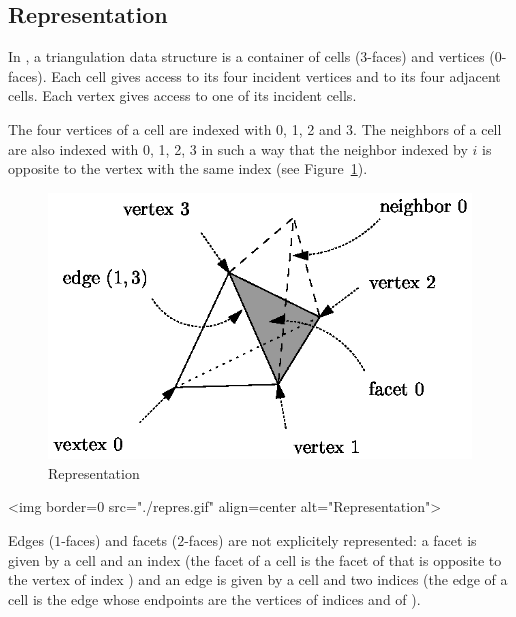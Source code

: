 \subsection{Representation}
\label{TDS3-sec-def}

In \cgal, a triangulation data structure is a
container of cells ($3$-faces) and vertices ($0$-faces). Each cell gives
access to its four incident vertices and to its four adjacent
cells. Each vertex gives access to one of its incident cells.

The four vertices of a cell are indexed with 0, 1, 2 and 3.  The
neighbors of a cell are also indexed with 0, 1, 2, 3 
in such a way that the neighbor indexed by $i$ is opposite to the vertex
with the same index (see Figure~\ref{TDS3-fig-repres}).

\begin{ccTexOnly}
\begin{figure}
\begin{center} 
\includegraphics{repres.eps}
\end{center}
\caption{Representation \label{TDS3-fig-repres}}
\end{figure} 
\end{ccTexOnly}

\begin{ccHtmlOnly}
<img border=0 src="./repres.gif" align=center
alt="Representation">
\end{ccHtmlOnly}

Edges ($1$-faces) and facets ($2$-faces) are not explicitely
represented: a facet is given by a cell and an index (the facet
 of a cell  is the facet of  that is opposite to
the vertex of index ) and an edge is given by a cell and two
indices (the edge  of a cell  is the edge
whose endpoints are the vertices of indices  and  of
). 

